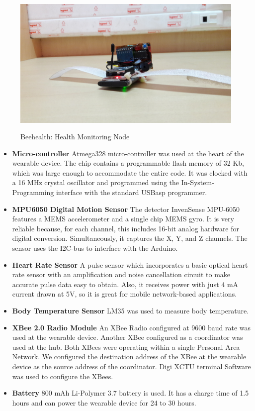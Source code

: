 \begin{figure}
\includegraphics[scale=0.08]{images/elderly_monitoring.jpg}
\label{fig:3}
\caption{Beehealth: Health Monitoring Node}
\end{figure}

\begin{itemize}
\item \textbf{Micro-controller}
Atmega328 micro-controller was used at the heart of the wearable device. The chip contains a programmable flash memory of 32 Kb, which was large enough to accommodate the entire code. It was clocked with a 16 MHz crystal oscillator and programmed using the In-System-Programming interface with the standard USBasp programmer.

\item \textbf{MPU6050 Digital Motion Sensor}
The detector InvenSense MPU-6050 features a MEMS accelerometer and a single chip MEMS gyro. It is very reliable because, for each channel, this includes 16-bit analog hardware for digital conversion. Simultaneously, it captures the X, Y, and Z channels. The sensor uses the I2C-bus to interface with the Arduino.

\item \textbf{Heart Rate Sensor}
A pulse sensor which incorporates a basic optical heart rate sensor with an amplification and noise cancellation circuit to make accurate pulse data easy to obtain. Also, it receives power with just 4 mA current drawn at 5V, so it is great for mobile network-based applications.

\item \textbf{Body Temperature Sensor}
LM35 was used to measure body temperature.

\item \textbf{XBee 2.0 Radio Module}
An XBee Radio configured at 9600 baud rate was used at the wearable device. Another XBee configured as a coordinator was used at the hub. Both XBees were operating within a single Personal Area Network. We configured the destination address of the XBee at the wearable device as the source address of the coordinator. Digi XCTU terminal Software was used to configure the XBees.

\item \textbf{Battery}
800 mAh Li-Polymer 3.7 battery is used. It has a charge time of 1.5 hours and can power the wearable device for 24 to 30 hours. 
\end{itemize}


